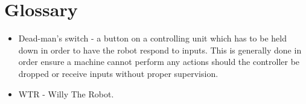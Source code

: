 \section{Glossary}
\begin{itemize}
\item \label{trm::dms} Dead-man's switch - a button on a controlling unit which has to be held down in order to have the robot respond to inputs. This is generally done in order ensure a machine cannot perform any actions should the controller be dropped or receive inputs without proper supervision.
\item WTR - Willy The Robot.
\end{itemize}